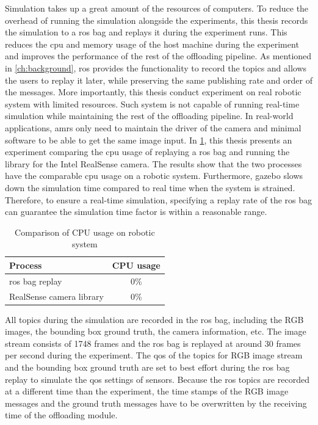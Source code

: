 Simulation takes up a great amount of the resources of computers. To reduce the overhead of running the simulation alongside the experiments, this thesis records the simulation to a \gls{ros} bag and replays it during the experiment runs. This reduces the \gls{cpu} and memory usage of the host machine during the experiment and improves the performance of the rest of the offloading pipeline. As mentioned in \cref{ch:background}, \gls{ros} provides the functionality to record the topics and allows the users to replay it later, while preserving the same publishing rate and order of the messages. More importantly, this thesis conduct experiment on real robotic system with limited resources. Such system is not capable of running real-time simulation while maintaining the rest of the offloading pipeline. In real-world applications, \glspl{amr} only need to maintain the driver of the camera and minimal software to be able to get the same image input. In \cref{tab:ros_bag_comparison}, this thesis presents an experiment comparing the \gls{cpu} usage of replaying a \gls{ros} bag and running the library for the Intel RealSense camera. The results show that the two processes have the comparable \gls{cpu} usage on a robotic system. Furthermore, \gls{gazebo} slows down the simulation time compared to real time when the system is strained. Therefore, to ensure a real-time simulation, specifying a replay rate of the \gls{ros} bag can guarantee the simulation time factor is within a reasonable range. 

\begin{table}[htp]
    \centering
    \begin{tabular}{lc}
    \toprule
    Process&                    CPU usage\\
    \midrule
    \gls{ros} bag replay&       0\%\\
    RealSense camera library&   0\%\\
    \bottomrule
    \end{tabular}
    \caption{Comparison of CPU usage on robotic system}
    \label{tab:ros_bag_comparison}
\end{table}

All topics during the simulation are recorded in the \gls{ros} bag, including the RGB images, the bounding box ground truth, the camera information, etc. The image stream consists of 1748 frames and the \gls{ros} bag is replayed at around 30 frames per second during the experiment. The \gls{qos} of the topics for RGB image stream and the bounding box ground truth are set to best effort during the \gls{ros} bag replay to simulate the \gls{qos} settings of sensors. Because the \gls{ros} topics are recorded at a different time than the experiment, the time stamps of the RGB image messages and the ground truth messages have to be overwritten by the receiving time of the offloading module. 



